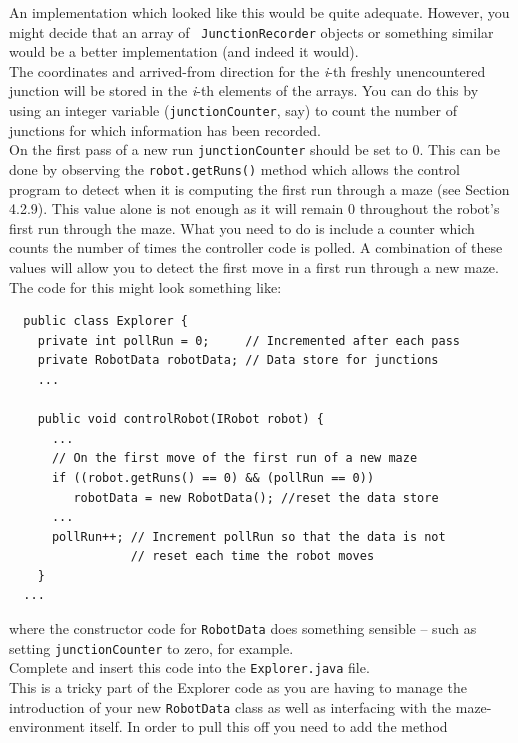 \noindent An implementation which looked like this would be
quite adequate. However, you might decide that an array of {\tt
JunctionRecorder} objects or
something similar would be a better implementation (and indeed it would).\\

\noindent
The coordinates and arrived-from direction for the {\em i}-th
freshly unencountered junction will be stored in the {\em i}-th
elements of the arrays. You can do this by using an integer
variable ({\tt junctionCounter}, say) to count the number of
junctions for which information has been recorded.\\

\noindent
On the first pass of a new run {\tt junctionCounter} should be
set to 0. This can be done by observing the {\tt robot.getRuns()}
method which allows the control program to detect when it is
computing the first run through a maze (see Section 4.2.9). This
value alone is not enough as it will remain 0 throughout the
robot's first run through the maze. What you need to do is
include a counter which counts the number of times the controller
code is polled. A combination of these values will allow you to
detect the first move in a first run through a
new maze. \\

\noindent
The code for this might look something like: \\

\begin{verbatim}
  public class Explorer {
    private int pollRun = 0;     // Incremented after each pass
    private RobotData robotData; // Data store for junctions
    ...

    public void controlRobot(IRobot robot) {
      ...
      // On the first move of the first run of a new maze
      if ((robot.getRuns() == 0) && (pollRun == 0))
         robotData = new RobotData(); //reset the data store
      ...
      pollRun++; // Increment pollRun so that the data is not
                 // reset each time the robot moves
    }
  ...
\end{verbatim}

\noindent where the constructor code for {\tt RobotData} does
something sensible -- such as setting {\tt junctionCounter} to
zero, for example. \\

\noindent
Complete and insert this code into the {\tt Explorer.java} file. \\

\noindent
This is a tricky part of the Explorer code as you are having to
manage the introduction of your new {\tt RobotData} class as well
as interfacing with the maze-environment itself. In order to pull
this off you need to add the method

